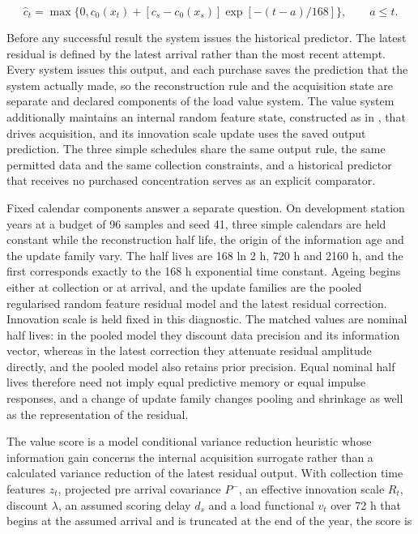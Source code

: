 \documentclass[lineno,pdflatex,sn-apa]{sn-jnl}%
\theoremstyle{thmstyleone}%
\theoremstyle{thmstyletwo}%
\theoremstyle{thmstylethree}%
\begin{document}
\begin{equation}
\widehat c_t=\max\{0,c_0(x_t)+[c_s-c_0(x_s)]\exp[-(t-a)/168]\},\qquad a\le t.
\end{equation}

Before any successful result the system issues the historical predictor. The latest residual is defined by the latest arrival rather than the most recent attempt. Every system issues this output, and each purchase saves the prediction that the system actually made, so the reconstruction rule and the acquisition state are separate and declared components of the load value system. The value system additionally maintains an internal random feature state, constructed as in \citep{rahimi2007}, that drives acquisition, and its innovation scale update uses the saved output prediction. The three simple schedules share the same output rule, the same permitted data and the same collection constraints, and a historical predictor that receives no purchased concentration serves as an explicit comparator.

Fixed calendar components answer a separate question. On development station years at a budget of 96 samples and seed 41, three simple calendars are held constant while the reconstruction half life, the origin of the information age and the update family vary. The half lives are 168 ln 2 h, 720 h and 2160 h, and the first corresponds exactly to the 168 h exponential time constant. Ageing begins either at collection or at arrival, and the update families are the pooled regularised random feature residual model and the latest residual correction. Innovation scale is held fixed in this diagnostic. The matched values are nominal half lives: in the pooled model they discount data precision and its information vector, whereas in the latest correction they attenuate residual amplitude directly, and the pooled model also retains prior precision. Equal nominal half lives therefore need not imply equal predictive memory or equal impulse responses, and a change of update family changes pooling and shrinkage as well as the representation of the residual.

The value score is a model conditional variance reduction heuristic whose information gain concerns the internal acquisition surrogate rather than a calculated variance reduction of the latest residual output. With collection time features $z_t$, projected pre arrival covariance $P^-$, an effective innovation scale $R_t$, discount $\lambda$, an assumed scoring delay $d_s$ and a load functional $v_t$ over 72 h that begins at the assumed arrival and is truncated at the end of the year, the score is
\end{document}
